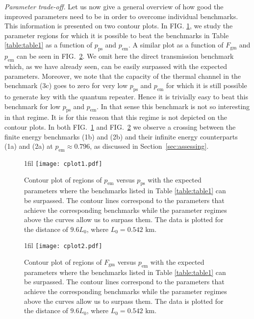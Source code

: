 \documentclass[aps,pra,reprint,superscriptaddress]{revtex4-1}
\makeatletter
\newcommand*{\centerfloat}{%
  \parindent \z@
  \leftskip \z@ \@plus 1fil \@minus \textwidth
  \rightskip\leftskip
  \parfillskip \z@skip}
\makeatother
\begin{document}
\smallskip
\textit{Parameter trade-off.}
Let us now give a general overview of how good the improved parameters need to be in order to overcome individual benchmarks. This information is presented on two contour plots. In FIG. \ref{fig:plot2}, we study the parameter regions for which it is possible to beat the benchmarks in Table \ref{table:table1} as a function of $p_{\textrm{ps}}$ and $p_{\textrm{em}}$. A similar plot as a function of $F_{\textrm{gm}}$ and $p_{\textrm{em}}$ can be seen in FIG.~\ref{fig:plot3}. We omit here the direct transmission benchmark which, as we have already seen, can be easily surpassed with the expected parameters. Moreover, we note that the capacity of the thermal channel in the benchmark (3c) goes to zero for very low $p_{\textrm{ps}}$ and $p_{\textrm{em}}$ for which it is still possible to generate key with the quantum repeater. Hence it is trivially easy to beat this benchmark for low $p_{\textrm{ps}}$ and $p_{\textrm{em}}$. In that sense this benchmark is not so interesting in that regime. It is for this reason that this regime is not depicted on the contour plots. In both FIG.~\ref{fig:plot2} and FIG.~\ref{fig:plot3} we observe a crossing between the finite energy benchmarks (1b) and (2b) and their infinite energy counterparts (1a) and (2a) at $p_{\textrm{em}}\approx 0.796$, as discussed in Section~\ref{sec:assessing}.
\begin{figure}[h]
\centerfloat
\texttt{[image: cplot1.pdf]}
\caption{Contour plot of regions of $p_{\textrm{em}}$ versus $p_{\textrm{ps}}$ with the expected parameters where the benchmarks listed in Table \ref{table:table1} can be surpassed. The contour lines correspond to the parameters that achieve the corresponding benchmarks while the parameter regimes above the curves allow us to surpass them. The data is plotted for the distance of $9.6L_0$, where $L_0= 0.542 \text{ km}$.}
\label{fig:plot2}
\end{figure}
%
\begin{figure}[h]
\centerfloat
\texttt{[image: cplot2.pdf]}
\caption{Contour plot of regions of $F_{\textrm{gm}}$ versus $p_{\textrm{em}}$ with the expected parameters where the benchmarks listed in Table \ref{table:table1} can be surpassed. The contour lines correspond to the parameters that achieve the corresponding benchmarks while the parameter regimes above the curves allow us to surpass them. The data is plotted for the distance of $9.6L_0$, where $L_0= 0.542 \text{ km}$.}
\label{fig:plot3}
\end{figure}
\end{document}
